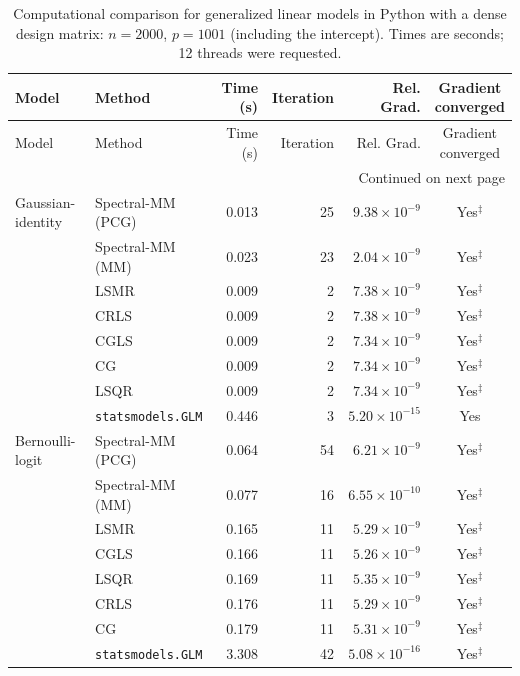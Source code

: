 \begingroup
\small
\setlength{\tabcolsep}{4pt}
\begin{longtable}{llrrrc}
\caption{Computational comparison for generalized linear models in Python with a dense design matrix: $n=2000$, $p=1001$ (including the intercept). Times are seconds; 12 threads were requested.}
\label{tab:python-dense-glm-initial}\\
\toprule
Model & Method & Time (s) & Iteration & Rel. Grad. & \shortstack{Gradient\\converged} \\
\midrule
\endfirsthead
\toprule
Model & Method & Time (s) & Iteration & Rel. Grad. & \shortstack{Gradient\\converged} \\
\midrule
\endhead
\midrule
\multicolumn{6}{r}{Continued on next page}\\
\endfoot
\bottomrule
\endlastfoot
Gaussian-identity & Spectral-MM (PCG) & 0.013 & 25 & $9.38\times10^{-9}$ & Yes$^{\ddagger}$ \\
 & Spectral-MM (MM) & 0.023 & 23 & $2.04\times10^{-9}$ & Yes$^{\ddagger}$ \\
 & LSMR & 0.009 & 2 & $7.38\times10^{-9}$ & Yes$^{\ddagger}$ \\
 & CRLS & 0.009 & 2 & $7.38\times10^{-9}$ & Yes$^{\ddagger}$ \\
 & CGLS & 0.009 & 2 & $7.34\times10^{-9}$ & Yes$^{\ddagger}$ \\
 & CG & 0.009 & 2 & $7.34\times10^{-9}$ & Yes$^{\ddagger}$ \\
 & LSQR & 0.009 & 2 & $7.34\times10^{-9}$ & Yes$^{\ddagger}$ \\
 & \texttt{statsmodels.GLM} & 0.446 & 3 & $5.20\times10^{-15}$ & Yes \\
\midrule
Bernoulli-logit & Spectral-MM (PCG) & 0.064 & 54 & $6.21\times10^{-9}$ & Yes$^{\ddagger}$ \\
 & Spectral-MM (MM) & 0.077 & 16 & $6.55\times10^{-10}$ & Yes$^{\ddagger}$ \\
 & LSMR & 0.165 & 11 & $5.29\times10^{-9}$ & Yes$^{\ddagger}$ \\
 & CGLS & 0.166 & 11 & $5.26\times10^{-9}$ & Yes$^{\ddagger}$ \\
 & LSQR & 0.169 & 11 & $5.35\times10^{-9}$ & Yes$^{\ddagger}$ \\
 & CRLS & 0.176 & 11 & $5.29\times10^{-9}$ & Yes$^{\ddagger}$ \\
 & CG & 0.179 & 11 & $5.31\times10^{-9}$ & Yes$^{\ddagger}$ \\
 & \texttt{statsmodels.GLM} & 3.308 & 42 & $5.08\times10^{-16}$ & Yes$^{\ddagger}$ \\

\end{longtable}
